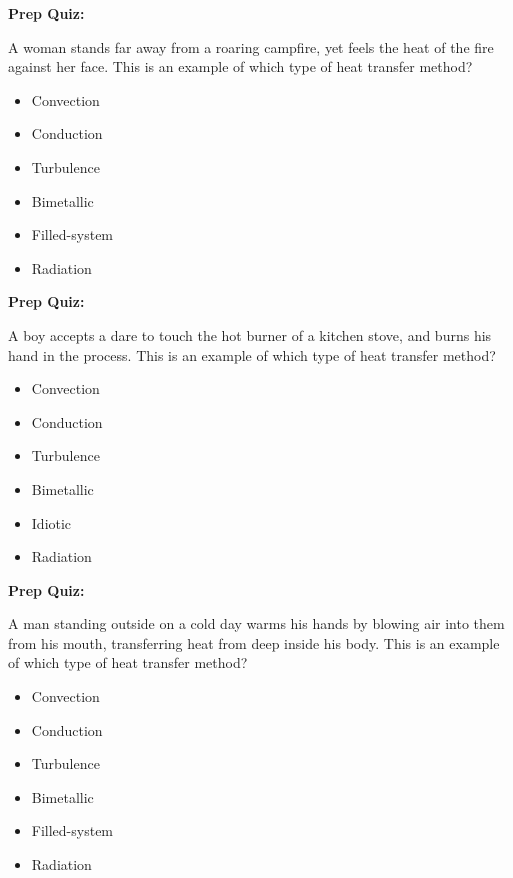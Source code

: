 \vfil \eject

\noindent
{\bf Prep Quiz:}

A woman stands far away from a roaring campfire, yet feels the heat of the fire against her face.  This is an example of which type of heat transfer method?

\begin{itemize}
\item{} Convection
\vskip 5pt 
\item{} Conduction
\vskip 5pt 
\item{} Turbulence
\vskip 5pt 
\item{} Bimetallic
\vskip 5pt 
\item{} Filled-system
\vskip 5pt 
\item{} Radiation
\end{itemize}









\vfil \eject

\noindent
{\bf Prep Quiz:}

A boy accepts a dare to touch the hot burner of a kitchen stove, and burns his hand in the process.  This is an example of which type of heat transfer method?

\begin{itemize}
\item{} Convection
\vskip 5pt 
\item{} Conduction
\vskip 5pt 
\item{} Turbulence
\vskip 5pt 
\item{} Bimetallic
\vskip 5pt 
\item{} Idiotic
\vskip 5pt 
\item{} Radiation
\end{itemize}








\vfil \eject

\noindent
{\bf Prep Quiz:}

A man standing outside on a cold day warms his hands by blowing air into them from his mouth, transferring heat from deep inside his body.  This is an example of which type of heat transfer method?

\begin{itemize}
\item{} Convection
\vskip 5pt 
\item{} Conduction
\vskip 5pt 
\item{} Turbulence
\vskip 5pt 
\item{} Bimetallic
\vskip 5pt 
\item{} Filled-system
\vskip 5pt 
\item{} Radiation
\end{itemize}




